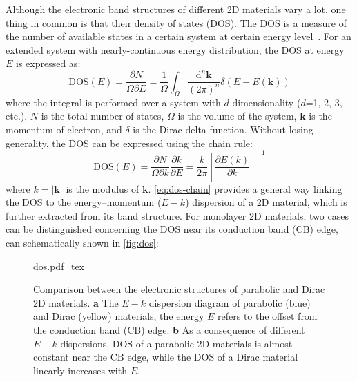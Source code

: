 Although the electronic band structures of different 2D materials vary
a lot, one thing in common is that their density of states (DOS). The
DOS is a measure of the number of available states in a certain system
at certain energy level~\cite{Kittel_2005_introduction_book}. For an
extended system with nearly-continuous energy distribution, the DOS at
energy $E$ is expressed as\cite{Kittel_2005_introduction_book}:
\begin{equation}
  \label{eq:ch-intro-dos}
  \mathrm{DOS}(E) = \frac{\partial N}{\Omega \partial E} =  \frac{1}{\Omega} {\displaystyle \int_{\Omega}} \frac{\mathrm{d}^{n} \mathbf{k}}{(2 \pi)^{n}}
  \delta(E - E(\mathbf{k}))
\end{equation}
where the integral is performed over a system with $d$-dimensionality
($d$=1, 2, 3, etc.), $N$ is the total number of states, $\Omega$ is
the volume of the system, $\mathbf{k}$ is the momentum of electron,
and $\delta$ is the Dirac delta function. Without losing generality,
the DOS can be expressed using the chain rule:
\begin{equation}
  \label{eq:dos-chain}
  \mathrm{DOS}(E) = \frac{\partial N}{\Omega \partial k} \frac{\partial k}{\partial E}
               = \frac{k}{2 \pi} \left[\frac{\partial E(k)}{\partial k}\right]^{-1}
\end{equation}
where $k=|\mathbf{k}|$ is the modulus of $\mathbf{k}$.
%
\autoref{eq:dos-chain} provides a general way linking the DOS to the
energy--momentum ($E-k$) dispersion of a 2D material, which is further
extracted from its band structure. For monolayer 2D materials, two
cases can be distinguished concerning the DOS near its conduction band
(CB) edge, can schematically shown in \autoref{fig:dos}:
\begin{figure}[h]
  \centering
  {dos.pdf_tex}
  \caption{\label{fig:dos}%
    Comparison between the electronic structures of parabolic and
    Dirac 2D materials. \textbf{a} The $E-k$ dispersion diagram of
    parabolic (blue) and Dirac (yellow) materials, the energy $E$
    refers to the offset from the conduction band (CB) edge.
    \textbf{b} As a consequence of different $E-k$ dispersions, DOS of
    a parabolic 2D materials is almost constant near the CB edge,
    while the DOS of a Dirac material linearly increases with $E$.  %
  }
\end{figure}

